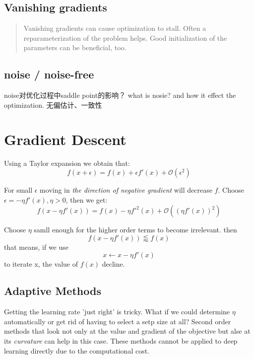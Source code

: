 \subsection{Vanishing gradients}
\begin{quotation}
    Vanishing gradients can cause optimization to stall. Often a reparameterization of the problem
    helps. Good initialization of the parameters can be beneficial, too.\cite{zhang2020dive}
\end{quotation}

\subsection{noise / noise-free}
noise对优化过程中saddle point的影响？
what is nosie? and how it effect the optimization.
无偏估计、一致性

\section{Gradient Descent}
Using a Taylor expansion we obtain that:
\begin{equation}
    f(x + \epsilon) = f(x) + \epsilon f'(x) + \mathcal{O} (\epsilon^2)
\end{equation}
\par
For small $\epsilon$ moving in \textit{the direction of negative gradient} will decrease $f$. Choose $\epsilon =
    -\eta f'(x), \eta > 0$, then we get:
\begin{equation}
    f(x - \eta f'(x)) = f(x) - \eta f'^2(x) + \mathcal{O} ((\eta f'(x))^2)
\end{equation}
\par Choose $\eta$ samll enough for the higher order terms to become irrelevant. then
\begin{equation}
    f(x - \eta f'(x)) \lessapprox f(x)
\end{equation}
that means, if we use
\begin{equation}
    x \leftarrow x - \eta f'(x)
\end{equation}
to iterate x, the value of $f(x)$ decline.

\subsection{Adaptive Methods}
Getting the learning rate 'just right' is tricky. What if we could determine $\eta$ automatically or get rid of having to select
a setp size at all? Second order methods that look not only at the value and gradient of the objective but alse at its \textit{curvature}
can help in this case. These methods cannot be applied to deep learning directly due to the computational cost.

